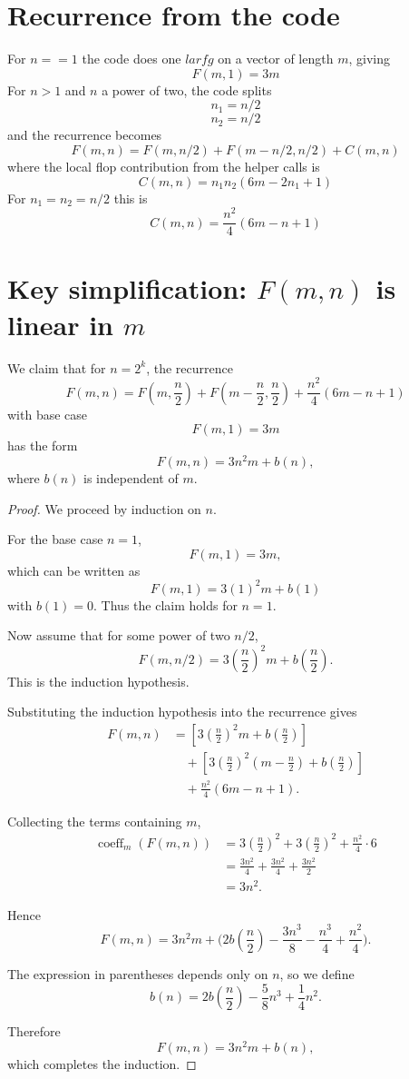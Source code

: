 \documentclass[10pt]{article}
\begin{document}
\section{Recurrence from the code}

For $n == 1$ the code does one $larfg$ on a vector of length $m$, giving
\[F(m,1) = 3 m\]
For $n > 1$ and $n$ a power of two, the code splits
\[n_1 = n/2\]
\[n_2 = n/2\]
and the recurrence becomes
\[F(m,n) = F(m,n/2) + F(m-n/2,n/2) + C(m,n)\]
where the local flop contribution from the helper calls is
\[C(m,n) = n_1 n_2 (6 m - 2 n_1 + 1)\]
For $n_1=n_2=n/2$ this is
\[C(m,n) = \frac{n^2}{4}  (6 m - n + 1)\]

\section{Key simplification: $F(m,n)$ is linear in $m$}

We claim that for $n=2^k$, the recurrence
\[ F(m,n) = F\!\left(m,\frac{n}{2}\right) + F\!\left(m-\frac{n}{2},\frac{n}{2}\right) + \frac{n^2}{4}(6m-n+1) \]
with base case
\[ F(m,1)=3m \]
has the form
\[ F(m,n)=3n^2m+b(n), \]
where $b(n)$ is independent of $m$.
\begin{proof}
We proceed by induction on $n$.

For the base case $n=1$,
\[ F(m,1)=3m, \]
which can be written as
\[ F(m,1)=3(1)^2m+b(1) \]
with $b(1)=0$. Thus the claim holds for $n=1$.

Now assume that for some power of two $n/2$,
\[ F(m,n/2) = 3\left(\frac{n}{2}\right)^2m + b\!\left(\frac{n}{2}\right).  \]
This is the induction hypothesis.

Substituting the induction hypothesis into the recurrence gives
\begin{align*}
F(m,n) &= \left[ 3\left(\frac{n}{2}\right)^2m + b\!\left(\frac{n}{2}\right) \right] \\
&\quad+ \left[ 3\left(\frac{n}{2}\right)^2 \left(m-\frac{n}{2}\right) + b\!\left(\frac{n}{2}\right) \right] \\
&\quad+ \frac{n^2}{4}(6m-n+1).
\end{align*}

Collecting the terms containing $m$,
\begin{align*}
\operatorname{coeff}_m(F(m,n))
&= 3\left(\frac{n}{2}\right)^2 + 3\left(\frac{n}{2}\right)^2 + \frac{n^2}{4}\cdot 6 \\
&= \frac{3n^2}{4} + \frac{3n^2}{4} + \frac{3n^2}{2} \\
&= 3n^2.
\end{align*}

Hence
\[
F(m,n) = 3n^2m + \Biggl( 2b\!\left(\frac{n}{2}\right) -\frac{3n^3}{8} -\frac{n^3}{4} +\frac{n^2}{4} \Biggr).
\]

The expression in parentheses depends only on $n$, so we define
\[ b(n) = 2b\!\left(\frac{n}{2}\right) -\frac{5}{8}n^3 +\frac{1}{4}n^2.  \]

Therefore
\[ F(m,n)=3n^2m+b(n), \]
which completes the induction.
\end{proof}
\end{document}
